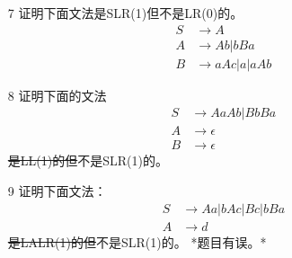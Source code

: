\documentclass[]{ctexart}
\begin{document}
\begin{enumerate}
	\newpage
	\item[7] 证明下面文法是SLR(1)但不是LR(0)的。
	\begin{align*}
		S &\to A \\
		A &\to Ab | bBa \\
		B &\to aAc | a | aAb
	\end{align*}
	
	
	\newpage
	\item[8] 证明下面的文法
	\begin{align*}
		S &\to AaAb | BbBa \\
		A &\to \epsilon \\
		B &\to \epsilon
	\end{align*}
	\sout{是LL(1)的但}不是SLR(1)的。
	
	
	\item[9] 证明下面文法：
	\begin{align*}
		S &\to Aa | bAc | Bc | bBa \\
		A &\to d
	\end{align*}
	\sout{是LALR(1)的但}不是SLR(1)的。
	*题目有误。*
\end{enumerate}
\end{document}

